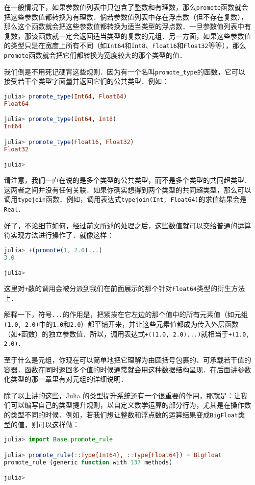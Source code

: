 在一般情况下，如果参数值列表中只包含了整数和有理数，那么\verb|promote|函数就会把这些参数值都转换为有理数．倘若参数值列表中存在浮点数（但不存在复数），那么这个函数就会把这些参数值都转换为适当类型的浮点数．一旦参数值列表中有复数，那该函数就一定会返回适当类型的复数的元组．另一方面，如果这些参数值的类型只是在宽度上所有不同（如\verb|Int64|和\verb|Int8|、\verb|Float16|和\verb|Float32|等等），那么\verb|promote|函数就会把它们都转换为宽度较大的那个类型的值．

我们倒是不用死记硬背这些规则．因为有一个名叫\verb|promote_type|的函数，它可以接受若干个类型字面量并返回它们的公共类型．例如：
\begin{lstlisting}[language=julia]
julia> promote_type(Int64, Float64)
Float64

julia> promote_type(Int64, Int8)
Int64

julia> promote_type(Float16, Float32)
Float32

julia> 
\end{lstlisting}

请注意，我们一直在说的是多个类型的公共类型，而不是多个类型的共同超类型．这两者之间并没有任何关联．如果你确实想得到两个类型的共同超类型，那么可以调用\verb|typejoin|函数．例如，调用表达式\verb|typejoin(Int, Float64)|的求值结果会是\verb|Real|．

好了，不论细节如何，经过前文所述的处理之后，这些数值就可以交给普通的运算符实现方法进行操作了．就像这样：
\begin{lstlisting}[language=julia]
julia> +(promote(1, 2.0)...)
3.0

julia> 
\end{lstlisting}

这里对\verb|+|数的调用会被分派到我们在前面展示的那个针对\verb|Float64|类型的衍生方法上．

解释一下，符号\verb|...|的作用是，把紧挨在它左边的那个值中的所有元素值（如元组\verb|(1.0, 2.0)|中的\verb|1.0|和\verb|2.0|）都平铺开来，并让这些元素值都成为传入外层函数（如\verb|+|函数）的独立参数值．所以，调用表达式\verb|+((1.0, 2.0)...)|就相当于\verb|+(1.0, 2.0)|．

至于什么是元组，你现在可以简单地把它理解为由圆括号包裹的、可承载若干值的容器．函数在同时返回多个值的时候通常就会用这种数据结构呈现．在后面讲参数化类型的那一章里有对元组的详细说明．

除了以上讲的这些，Julia 的类型提升系统还有一个很重要的作用，那就是：让我们可以编写自己的类型提升规则，以自定义数学运算的部分行为，尤其是在操作数的类型不同的时候．例如，若我们想让整数和浮点数的运算结果变成\verb|BigFloat|类型的值，则可以这样做：
\begin{lstlisting}[language=julia]
julia> import Base.promote_rule

julia> promote_rule(::Type{Int64}, ::Type{Float64}) = BigFloat
promote_rule (generic function with 137 methods)

julia>
\end{lstlisting}

